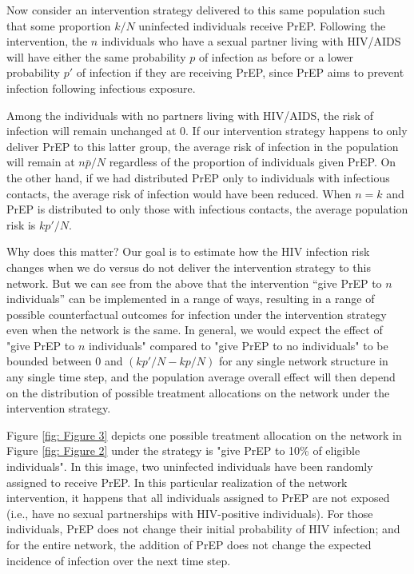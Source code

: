 \documentclass{article}
\theoremstyle{definition}
\begin{document}
Now consider an intervention strategy delivered to this same population such that some proportion $k/N$ uninfected individuals receive PrEP.  Following the intervention, the $n$ individuals who have a sexual partner living with HIV/AIDS will have either the same probability $p$ of infection as before or a lower probability $p'$ of infection if they are receiving PrEP, since PrEP aims to prevent infection following infectious exposure. 

Among the individuals with no partners living with HIV/AIDS, the risk of infection will remain unchanged at 0. If our intervention strategy happens to only deliver PrEP to this latter group, the average risk of infection in the population will remain at $n\bar{p}/N$ regardless of the proportion of individuals given PrEP. On the other hand, if we had distributed PrEP only to individuals with infectious contacts, the average risk of infection would have been reduced. When $n=k$ and PrEP is distributed to only those with infectious contacts, the average population risk is $kp'/N$.

Why does this matter? Our goal is to estimate how the HIV infection risk changes when we do versus do not deliver the intervention strategy to this network. But we can see from the above that the intervention “give PrEP to $n$ individuals” can be implemented in a range of ways, resulting in a range of possible counterfactual outcomes for infection under the intervention strategy even when the network is the same. In general, we would expect the effect of "give PrEP to $n$ individuals" compared to "give PrEP to no individuals" to be bounded between 0 and $(kp'/N - kp/N)$ for any single network structure in any single time step, and the population average overall effect will then depend on the distribution of possible treatment allocations on the network under the intervention strategy. 

Figure \ref{fig: Figure 3}  depicts one possible treatment allocation on the network in Figure \ref{fig: Figure 2} under the strategy is "give PrEP to 10\% of eligible individuals". In this image, two uninfected individuals have been randomly assigned to receive PrEP. In this particular realization of the network intervention, it happens that all individuals assigned to PrEP are not exposed (i.e., have no sexual partnerships with HIV-positive individuals). For those individuals, PrEP does not change their initial probability of HIV infection; and for the entire network, the addition of PrEP does not change the expected incidence of infection over the next time step.
\end{document}
